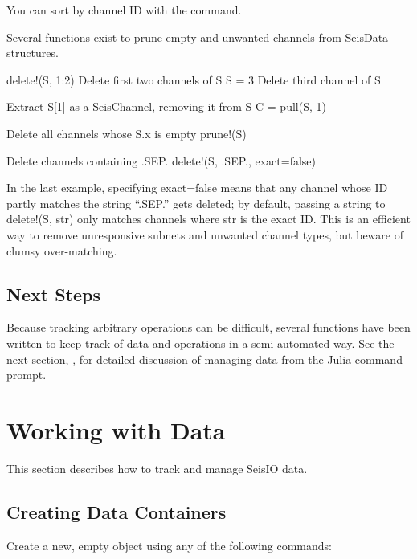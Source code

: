 \documentclass[letterpaper,11pt,english]{sphinxmanual}
\begin{document}
You can sort by channel ID with the  command.

Several functions exist to prune empty and unwanted channels from SeisData
structures.

\begin{sphinxVerbatim}[commandchars=\\\{\}]
delete!(S, 1:2)  \PYGZsh{} Delete first two channels of S
S \PYGZhy{}= 3           \PYGZsh{} Delete third channel of S

\PYGZsh{} Extract S[1] as a SeisChannel, removing it from S
C = pull(S, 1)

\PYGZsh{} Delete all channels whose S.x is empty
prune!(S)

\PYGZsh{} Delete channels containing \PYGZdq{}.SEP.\PYGZdq{}
delete!(S, \PYGZdq{}.SEP.\PYGZdq{}, exact=false)
\end{sphinxVerbatim}

In the last example, specifying exact=false means that any channel whose ID
partly matches the string “.SEP.” gets deleted; by default, passing
a string to delete!(S, str) only matches channels where str is the exact ID.
This is an efficient way to remove unresponsive subnets and unwanted channel
types, but beware of clumsy over-matching.


\subsection{Next Steps}
\label{\detokenize{src/tutorial:next-steps}}
Because tracking arbitrary operations can be difficult, several functions have
been written to keep track of data and operations in a semi-automated way. See
the next section, {\hyperref[\detokenize{src/working_with_data:wwd}]{}}, for detailed discussion of
managing data from the Julia command prompt.


\section{Working with Data}
\label{\detokenize{src/working_with_data:working-with-data}}\label{\detokenize{src/working_with_data:wwd}}\label{\detokenize{src/working_with_data::doc}}
This section describes how to track and manage SeisIO data.


\subsection{Creating Data Containers}
\label{\detokenize{src/working_with_data:creating-data-containers}}
Create a new, empty object using any of the following commands:
\end{document}
